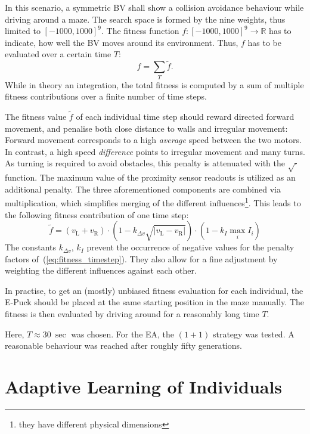 \documentclass[a4paper]{jacow}
\begin{document}
In this scenario, a symmetric BV shall show a collision avoidance behaviour while driving around a maze. The search space is formed by the nine weights, thus limited to $[-1000,1000]^9$. The fitness function $f:[-1000,1000]^9\to \mathbb{R}$ has to indicate, how well the BV moves around its environment. Thus, $f$ has to be evaluated over a certain time $T$:
\begin{equation}
	f = \sum\limits_T \tilde{f}.
\end{equation}
While in theory an integration, the total fitness is computed by a sum of multiple fitness contributions over a finite number of time steps. 

The fitness value $\tilde{f}$ of each individual time step should reward directed forward movement, and penalise both close distance to walls and irregular movement: Forward movement corresponds to a high \emph{average} speed between the two motors. In contrast, a high speed \emph{difference} points to irregular movement and many turns. As turning is required to avoid obstacles, this penalty is attenuated with the $\sqrt{\cdot}$ function. The maximum value of the proximity sensor readouts is utilized as an additional penalty. The three aforementioned components are combined via multiplication, which simplifies merging of the different influences\footnote{they have different physical dimensions}. This leads to the following fitness contribution of one time step:
\begin{equation}
	\tilde{f} = \left( v_\mathrm{L} + v_\mathrm{R} \right) \cdot \left( 1 - k_{\Delta v}\sqrt{|v_\mathrm{L}-v_\mathrm{R}|} \right) \cdot \left(1- k_{I} \max\limits_i I_i\right)
	\label{eq:fitness_timestep} 
\end{equation}
The constants $k_{\Delta v}$, $k_I$ prevent the occurrence of negative values for the penalty factors of~(\ref{eq:fitness_timestep}). They also allow for a fine adjustment by weighting the different influences against each other.

In practise, to get an (mostly) unbiased fitness evaluation for each individual, the E-Puck should be placed at the same starting position in the maze manually. The fitness is then evaluated by driving around for a reasonably long time $T$. 

Here, $T\approx\SI{30}{\sec}$ was chosen. For the EA, the $(1+1)$ strategy was tested. A reasonable behaviour was reached after roughly fifty generations.


\section{Adaptive Learning of Individuals}
\end{document}
